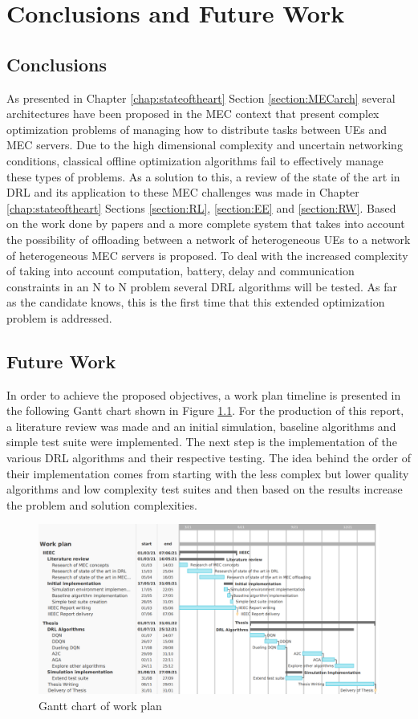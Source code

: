 \chapter{Conclusions and Future Work}
\section{Conclusions}
\noindent As presented in Chapter \ref{chap:stateoftheart} Section \ref{section:MECarch} several architectures have been proposed in the \acrshort{MEC} context that present complex optimization problems of managing how to distribute tasks between \acrshort{UE}s and \acrshort{MEC} servers. Due to the high dimensional complexity and uncertain networking conditions, classical offline optimization algorithms fail to effectively manage these types of problems. As a solution to this, a review of the state of the art in \acrshort{DRL} and its application to these \acrshort{MEC} challenges was made in Chapter \ref{chap:stateoftheart} Sections \ref{section:RL}, \ref{section:EE} and \ref{section:RW}. Based on the work done by papers \cite{NUE1mec} and \cite{taskclass1} a more complete system that takes into account the possibility of offloading between a network of heterogeneous \acrshort{UE}s to a network of heterogeneous \acrshort{MEC} servers is proposed. To deal with the increased complexity of taking into account computation, battery, delay and communication constraints in an N to N problem several \acrshort{DRL} algorithms will be tested. As far as the candidate knows, this is the first time that this extended optimization problem is addressed.

\clearpage
\section{Future Work}
\noindent In order to achieve the proposed objectives, a work plan timeline is presented in the following Gantt chart shown in Figure \ref{ganttchart}. For the production of this report, a literature review was made and an initial simulation, baseline algorithms and simple test suite were implemented. The next step is the implementation of the various \acrshort{DRL} algorithms and their respective testing. The idea behind the order of their implementation comes from starting with the less complex but lower quality algorithms and low complexity test suites and then based on the results increase the problem and solution complexities.

\begin{figure}[h]
  \centering
  \includegraphics[width=\textwidth]{images/workPlan.png}
  \caption{Gantt chart of work plan} \label{ganttchart}
\end{figure}